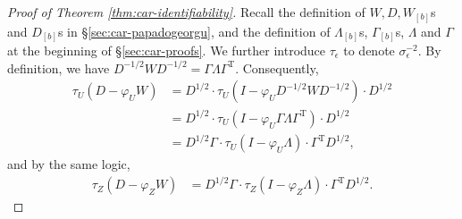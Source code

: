 \documentclass[11pt]{article}
\theoremstyle{definition}
\theoremstyle{remark}
\def\top{{ \mathrm{\scriptscriptstyle T} }}
\begin{document}
\begin{proof}[Proof of Theorem \ref{thm:car-identifiability}]

Recall the definition of $W, D, W_{[b]}$s and $D_{[b]}$s in \S\ref{sec:car-papadogeorgu}, 
and the definition of $\Lambda_{[b]}$s,
$\Gamma_{[b]}$s, $\Lambda$ and $\Gamma$ at the beginning of \S\ref{sec:car-proofs}. 
We further introduce 
$\tau_\epsilon$ to denote $\sigma_\epsilon^{-2}$.
By definition, we have
$D^{-1/2} W D^{-1/2} = \Gamma \Lambda \Gamma^\top$. 
Consequently, 
\begin{align}\label{eq:DW_simp_U}
    \tau_U (D-\varphi_U W)
    & = 
    D^{1/2} \cdot \tau_U (I- \varphi_U D^{-1/2} W D^{-1/2}) \cdot D^{1/2}
    \nonumber
    \\
    & = 
    D^{1/2} \cdot \tau_U (I- \varphi_U \Gamma \Lambda \Gamma^\top) \cdot D^{1/2}
    \nonumber
    \\
    & = 
    D^{1/2} \Gamma \cdot \tau_U (I- \varphi_U \Lambda ) \cdot \Gamma^\top D^{1/2}, 
\end{align}
and by the same logic, 
\begin{align}\label{eq:DW_simp_Z}
    \tau_Z (D-\varphi_Z W)
    & = 
    D^{1/2} \Gamma \cdot \tau_Z (I- \varphi_Z \Lambda ) \cdot \Gamma^\top D^{1/2}. 
\end{align}


\end{proof}
\end{document}

